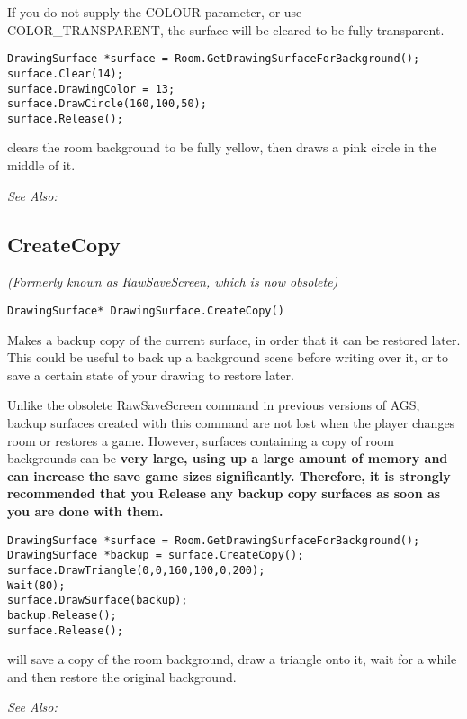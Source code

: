 If you do not supply the COLOUR parameter, or use COLOR_TRANSPARENT, the surface
will be cleared to be fully transparent.

\begin{verbatim}
DrawingSurface *surface = Room.GetDrawingSurfaceForBackground();
surface.Clear(14);
surface.DrawingColor = 13;
surface.DrawCircle(160,100,50);
surface.Release();
\end{verbatim}
clears the room background to be fully yellow, then draws a pink circle in the middle of it.

\it{See Also:} 


\subsection{CreateCopy}\label{DrawingSurface.CreateCopy}%

\it{(Formerly known as RawSaveScreen, which is now obsolete)}

\begin{verbatim}
DrawingSurface* DrawingSurface.CreateCopy()
\end{verbatim}
Makes a backup copy of the current surface, in order that it can be
restored later. This could be useful to back up a background scene before
writing over it, or to save a certain state of your drawing to restore
later.

Unlike the obsolete RawSaveScreen command in previous versions of AGS, backup
surfaces created with this command are not lost when the player changes room or
restores a game. However, surfaces containing a copy of room backgrounds can
be \bf{very large}, using up a large amount of memory and can increase the
save game sizes significantly. Therefore, it is \bf{strongly recommended} that
you Release any backup copy surfaces as soon as you are done with them.

\begin{verbatim}
DrawingSurface *surface = Room.GetDrawingSurfaceForBackground();
DrawingSurface *backup = surface.CreateCopy();
surface.DrawTriangle(0,0,160,100,0,200);
Wait(80);
surface.DrawSurface(backup);
backup.Release();
surface.Release();
\end{verbatim}
will save a copy of the room background, draw a triangle onto it, wait for
a while and then restore the original background.

\it{See Also:} 


